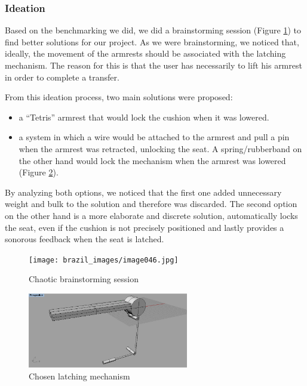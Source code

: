 \subsubsection{Ideation}
Based on the benchmarking we did, we did a brainstorming session (Figure \ref{fig:chaotic_brainstorming}) to find better solutions for our project. As we were brainstorming, we noticed that, ideally, the movement of the armrests should be associated with the latching mechanism. The reason for this is that the user has necessarily to lift his armrest in order to complete a transfer. 

From this ideation process, two main solutions were proposed:

\begin{itemize}
	\item a “Tetris” armrest that would lock the cushion when it was lowered. 
	\item a system in which a wire would be attached to the armrest and pull a pin when the armrest was retracted, unlocking the seat. A spring/rubberband on the other hand would lock the mechanism when the armrest was lowered (Figure \ref{fig:latching}).
\end{itemize}

By analyzing both options, we noticed that the first one added unnecessary weight and bulk to the solution and therefore was discarded. The second option on the other hand is a more elaborate and discrete solution, automatically locks the seat, even if the cushion is not precisely positioned and lastly provides a sonorous feedback when the seat is latched. \\

\begin{figure}[h]
\centering
\texttt{[image: brazil\_images/image046.jpg]}
\caption{Chaotic brainstorming session}
\label{fig:chaotic_brainstorming}
\end{figure}


\begin{figure}[h]
\centering
\includegraphics[width=7cm]{brazil_images/image048.png}
\caption{Chosen latching mechanism}
\label{fig:latching}
\end{figure}



